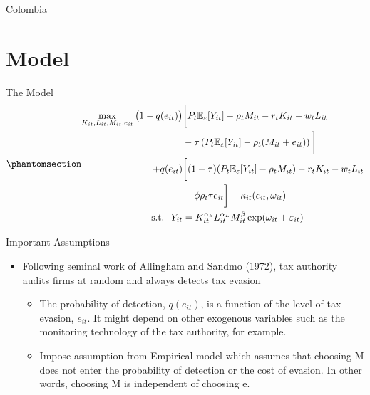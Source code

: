 \documentclass[
  ignorenonframetext,
  aspectratio=169,
]{beamer}
\providecommand{\tightlist}{%
  \setlength{\itemsep}{0pt}\setlength{\parskip}{0pt}}
\begin{document}
\begin{frame}{Colombia}
\protect{}\label{colombia}
\end{frame}

\section{Model}\label{model}

\begin{frame}{The Model}
\protect{}\label{the-model}
\begin{equation}\protect\phantomsection\label{eq-eva}{
\begin{aligned}
  \max_{K_{it},L_{it},M_{it}, e_{it}} \big(1-q(e_{it})\big)&\bigg[P_t\mathbb{E}_{\varepsilon}[Y_{it}]-\rho_{t} M_{it}-r_tK_{it}-w_tL_{it}\\
  &-\tau\left(P_t\mathbb{E}_{\varepsilon}[Y_{it}]-\rho_{t} (M_{it}+e_{it})\right)\bigg]\\
  +q(e_{it})&\bigg[(1-\tau)(P_t\mathbb{E}_{\varepsilon}[Y_{it}]-\rho_{t} M_{it})-r_tK_{it}-w_tL_{it}\\
  &-\phi\rho_t\tau e_{it}\bigg]-\kappa_{it}(e_{it}, \omega_{it}) \\
  \text{s.t. }\; Y_{it}&=K_{it}^{\alpha_k}L_{it}^{\alpha_L}M_{it}^{\beta}\exp(\omega_{it}+\varepsilon_{it})
\end{aligned}
}\end{equation}
\end{frame}

\begin{frame}{Important Assumptions}
\protect{}\label{important-assumptions}
\begin{itemize}
\tightlist
\item
  Following seminal work of Allingham and Sandmo (1972), tax authority
  audits firms at random and always detects tax evasion

  \begin{itemize}
  \tightlist
  \item
    The probability of detection, \(q(e_{it})\), is a function of the
    level of tax evasion, \(e_{it}\). It might depend on other exogenous
    variables such as the monitoring technology of the tax authority,
    for example.
  \item
    Impose assumption from Empirical model which assumes that choosing M
    does not enter the probability of detection or the cost of evasion.
    In other words, choosing M is independent of choosing e.
  \end{itemize}
\end{itemize}
\end{frame}
\end{document}
